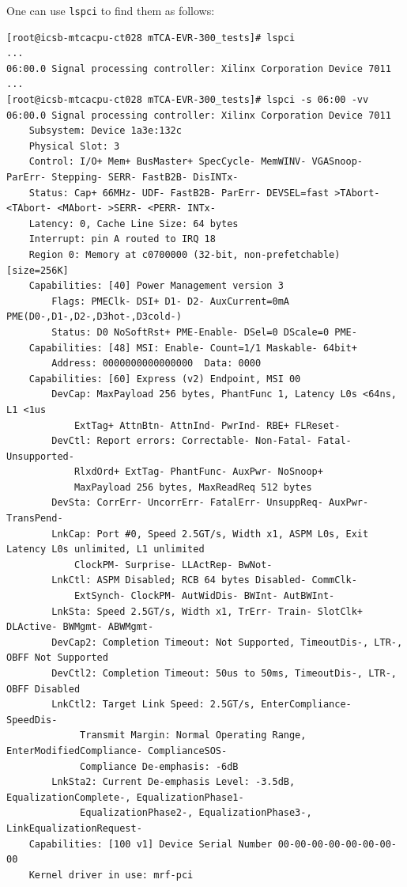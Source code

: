 \documentclass[11pt
  , a4paper
  , article
  , oneside
  , showtrims
]{memoir}
\begin{document}
One can use \texttt{lspci} to find them as follows:
\begin{lstlisting}[style=termstyle]
[root@icsb-mtcacpu-ct028 mTCA-EVR-300_tests]# lspci
...
06:00.0 Signal processing controller: Xilinx Corporation Device 7011
...
[root@icsb-mtcacpu-ct028 mTCA-EVR-300_tests]# lspci -s 06:00 -vv
06:00.0 Signal processing controller: Xilinx Corporation Device 7011
	Subsystem: Device 1a3e:132c
	Physical Slot: 3
	Control: I/O+ Mem+ BusMaster+ SpecCycle- MemWINV- VGASnoop- ParErr- Stepping- SERR- FastB2B- DisINTx-
	Status: Cap+ 66MHz- UDF- FastB2B- ParErr- DEVSEL=fast >TAbort- <TAbort- <MAbort- >SERR- <PERR- INTx-
	Latency: 0, Cache Line Size: 64 bytes
	Interrupt: pin A routed to IRQ 18
	Region 0: Memory at c0700000 (32-bit, non-prefetchable) [size=256K]
	Capabilities: [40] Power Management version 3
		Flags: PMEClk- DSI+ D1- D2- AuxCurrent=0mA PME(D0-,D1-,D2-,D3hot-,D3cold-)
		Status: D0 NoSoftRst+ PME-Enable- DSel=0 DScale=0 PME-
	Capabilities: [48] MSI: Enable- Count=1/1 Maskable- 64bit+
		Address: 0000000000000000  Data: 0000
	Capabilities: [60] Express (v2) Endpoint, MSI 00
		DevCap:	MaxPayload 256 bytes, PhantFunc 1, Latency L0s <64ns, L1 <1us
			ExtTag+ AttnBtn- AttnInd- PwrInd- RBE+ FLReset-
		DevCtl:	Report errors: Correctable- Non-Fatal- Fatal- Unsupported-
			RlxdOrd+ ExtTag- PhantFunc- AuxPwr- NoSnoop+
			MaxPayload 256 bytes, MaxReadReq 512 bytes
		DevSta:	CorrErr- UncorrErr- FatalErr- UnsuppReq- AuxPwr- TransPend-
		LnkCap:	Port #0, Speed 2.5GT/s, Width x1, ASPM L0s, Exit Latency L0s unlimited, L1 unlimited
			ClockPM- Surprise- LLActRep- BwNot-
		LnkCtl:	ASPM Disabled; RCB 64 bytes Disabled- CommClk-
			ExtSynch- ClockPM- AutWidDis- BWInt- AutBWInt-
		LnkSta:	Speed 2.5GT/s, Width x1, TrErr- Train- SlotClk+ DLActive- BWMgmt- ABWMgmt-
		DevCap2: Completion Timeout: Not Supported, TimeoutDis-, LTR-, OBFF Not Supported
		DevCtl2: Completion Timeout: 50us to 50ms, TimeoutDis-, LTR-, OBFF Disabled
		LnkCtl2: Target Link Speed: 2.5GT/s, EnterCompliance- SpeedDis-
			 Transmit Margin: Normal Operating Range, EnterModifiedCompliance- ComplianceSOS-
			 Compliance De-emphasis: -6dB
		LnkSta2: Current De-emphasis Level: -3.5dB, EqualizationComplete-, EqualizationPhase1-
			 EqualizationPhase2-, EqualizationPhase3-, LinkEqualizationRequest-
	Capabilities: [100 v1] Device Serial Number 00-00-00-00-00-00-00-00
	Kernel driver in use: mrf-pci

\end{lstlisting}
\end{document}
